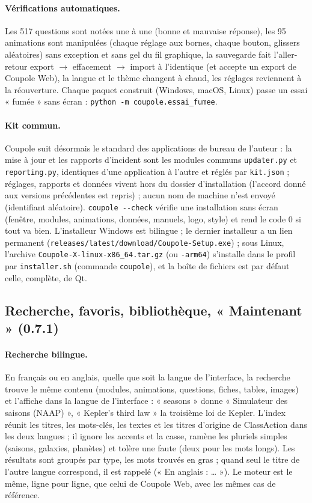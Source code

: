 \paragraph{Vérifications automatiques.} Les 517 questions sont notées une à une (bonne et mauvaise réponse), les 95
animations sont manipulées (chaque réglage aux bornes, chaque bouton, glissers aléatoires) sans exception et sans gel
du fil graphique, la sauvegarde fait l'aller-retour export $\to$ effacement $\to$ import à l'identique (et accepte un
export de Coupole Web), la langue et le thème changent à chaud, les réglages reviennent à la réouverture. Chaque paquet
construit (Windows, macOS, Linux) passe un essai « fumée » sans écran : \texttt{python -m coupole.essai\_fumee}.

\paragraph{Kit commun.} Coupole suit désormais le standard des applications de bureau de l'auteur : la mise à jour et
les rapports d'incident sont les modules communs \texttt{updater.py} et \texttt{reporting.py}, identiques d'une
application à l'autre et réglés par \texttt{kit.json} ; réglages, rapports et données vivent hors du dossier
d'installation (l'accord donné aux versions précédentes est repris) ; aucun nom de machine n'est envoyé (identifiant
aléatoire). \texttt{coupole -{}-check} vérifie une installation sans écran (fenêtre, modules, animations, données,
manuels, logo, style) et rend le code 0 si tout va bien. L'installeur Windows est bilingue ; le dernier installeur a
un lien permanent (\texttt{releases/latest/download/Coupole-Setup.exe}) ; sous Linux, l'archive
\texttt{Coupole-X-linux-x86\_64.tar.gz} (ou \texttt{-arm64}) s'installe dans le profil par \texttt{installer.sh}
(commande \texttt{coupole}), et la boîte de fichiers est par défaut celle, complète, de Qt.

\subsection{Recherche, favoris, bibliothèque, « Maintenant » (0.7.1)}\label{sec:favoris}
\paragraph{Recherche bilingue.} En français ou en anglais, quelle que soit la langue de l'interface, la recherche
trouve le même contenu (modules, animations, questions, fiches, tables, images) et l'affiche dans la langue de
l'interface : « seasons » donne « Simulateur des saisons (NAAP) », « Kepler's third law » la troisième loi de Kepler.
L'index réunit les titres, les mots-clés, les textes et les titres d'origine de ClassAction dans les deux langues ; il
ignore les accents et la casse, ramène les pluriels simples (saisons, galaxies, planètes) et tolère une faute (deux
pour les mots longs). Les résultats sont groupés par type, les mots trouvés en gras ; quand seul le titre de l'autre
langue correspond, il est rappelé (« En anglais : \dots{} »). Le moteur est le même, ligne pour ligne, que celui de
Coupole Web, avec les mêmes cas de référence.

